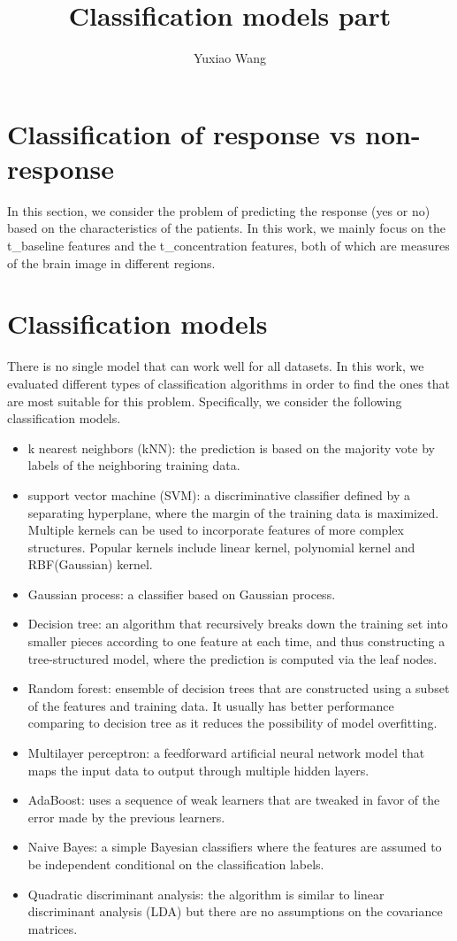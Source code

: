 \documentclass[12pt]{article}
\title{Classification models part}
\author{Yuxiao Wang}
\begin{document}
\pagestyle{plain}

\maketitle
\section{Classification of response vs non-response}
In this section, we consider the problem of predicting the response (yes or no) based on the characteristics of the patients. In this work, we mainly focus on the t\_baseline features and the t\_concentration features, both of which are measures of the brain image in different regions. 

\section{Classification models}
There is no single model that can work well for all datasets. In this work, we evaluated different types of classification algorithms in order to find the ones that are most suitable for this problem. Specifically, we consider the following classification models. 
\begin{itemize}  \setlength\itemsep{0em}

\item k nearest neighbors (kNN): the prediction is based on the majority vote by labels of the neighboring training data.
\item support vector machine (SVM): a discriminative classifier defined by a  separating hyperplane, where the margin of the training data is maximized. Multiple kernels can be used to incorporate features of more complex structures. Popular kernels include linear kernel,  polynomial kernel and RBF(Gaussian) kernel.
\item Gaussian process: a classifier based on Gaussian process. 
\item Decision tree: an algorithm that recursively breaks down the training set into smaller pieces according to one feature at each time, and thus constructing a tree-structured model, where the prediction is computed via the leaf nodes.
\item Random forest: ensemble of decision trees that are constructed using a subset of the features and training data. It usually has better performance comparing to decision tree as it reduces the possibility of model overfitting.
\item Multilayer perceptron: a feedforward artificial neural network model that maps the input data to output through multiple hidden layers.
\item AdaBoost: uses a sequence of weak learners that are tweaked in favor of the error made by the previous learners.
\item Naive Bayes: a simple Bayesian classifiers where the features are assumed to be independent conditional on the classification labels.
\item Quadratic discriminant analysis: the algorithm is similar to linear discriminant analysis (LDA) but there are no assumptions on the covariance matrices.
\end{itemize}
\end{document}
